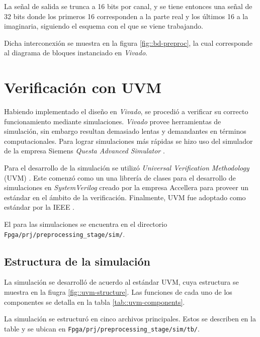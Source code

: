 \documentclass[../../main.tex]{subfiles}
\begin{document}
La señal de salida se trunca a 16 bits por canal, y se tiene entonces una señal de 32 bits donde los primeros 16 corresponden a la parte real y los últimos 16 a la imaginaria, siguiendo el esquema con el que se viene trabajando.

Dicha interconexión se muestra en la figura \ref{fig::bd-preproc}, la cual corresponde al diagrama de bloques instanciado en \textit{Vivado}. 


\section{Verificación con UVM}\label{sec::simu-uvm}
Habiendo implementado el diseño en \textit{Vivado}, se procedió a verificar su correcto funcionamiento mediante simulaciones. \textit{Vivado} provee herramientas de simulación, sin embargo resultan demasiado lentas y demandantes en términos computacionales. Para lograr simulaciones más rápidas se hizo uso del simulador de la empresa Siemens \textit{Questa Advanced Simulator} \cite{questa}. 

Para el desarrollo de la simulación se utilizó \textit{Universal Verification Methodology} (UVM) \cite{uvm}. Este comenzó como un una librería de clases para el desarrollo de simulaciones en \textit{SystemVerilog} creado por la empresa Accellera para proveer un estándar en el ámbito de la verificación. Finalmente, UVM fue adoptado como estándar por la IEEE \cite{uvm-ieee}.

El para las simulaciones se encuentra en el directorio \texttt{Fpga/prj/preprocessing\_stage/sim/}.

\subsection{Estructura de la simulación}
La simulación se desarrolló de acuerdo al estándar UVM, cuya estructura se muestra en la fiugra \ref{fig::uvm-structure}. Las funciones de cada uno de los componentes se detalla en la tabla \ref{tab::uvm-components}.


La simulación se estructuró en cinco archivos principales. Estos se describen en la table  y se ubican en \texttt{Fpga/prj/preprocessing\_stage/sim/tb/}.
\end{document}
